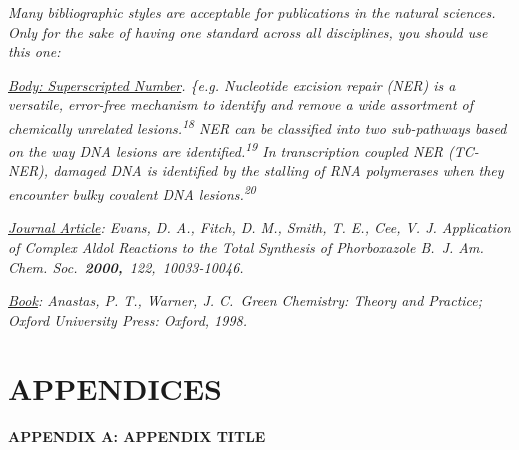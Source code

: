 \documentclass[
]{article}
\begin{document}
    \emph{Many bibliographic styles are acceptable for publications in the
    natural sciences. Only for the sake of having one standard across all
    disciplines, you should use this one:}

    \emph{\underline{Body: Superscripted Number}. \{e.g. Nucleotide excision
    repair (NER) is a versatile, error-free mechanism to identify and remove
    a wide assortment of chemically unrelated lesions.\textsuperscript{18}
    NER can be classified into two sub-pathways based on the way DNA lesions
    are identified.\textsuperscript{19} In transcription coupled NER
        (TC-NER), damaged DNA is identified by the stalling of RNA polymerases
        when they encounter bulky covalent DNA lesions.\textsuperscript{20}}

    \emph{\underline{Journal Article}: Evans, D. A., Fitch, D. M., Smith, T.
    E., Cee, V. J. Application of Complex Aldol Reactions to the Total
    Synthesis of Phorboxazole B.~J. Am. Chem.
    Soc.~\textbf{2000,}~122,~10033-10046.}

    \emph{\underline{Book}: Anastas, P. T., Warner, J. C.~Green Chemistry:
    Theory and Practice; Oxford University Press: Oxford, 1998.}

    \hypertarget{appendices}{%


        \section{APPENDICES}\label{appendices}}

    \protect\hypertarget{_Toc93021181}{}{}\textbf{APPENDIX A: APPENDIX
    TITLE}
\end{document}
